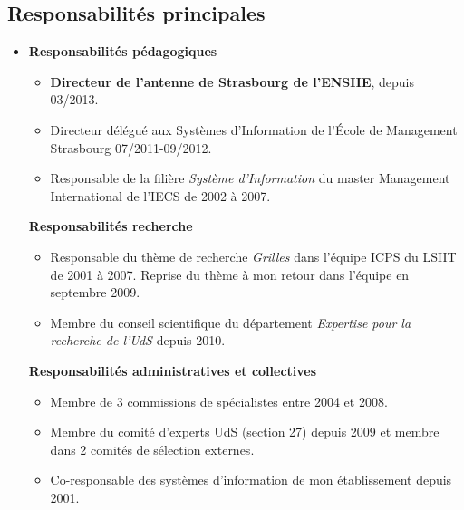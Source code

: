 \documentclass[11pt]{article}
\begin{document}

\subsection{Responsabilités principales}
\vspace{3mm}
\medskip

\begin{itemize}
\item
 	\textbf{Responsabilités pédagogiques}\\[-1mm]
	\begin{itemize}
		\item \textbf{Directeur de l'antenne de Strasbourg de l'ENSIIE}, depuis 03/2013.
		\item Directeur délégué aux Systèmes d'Information de 
		      l'\'Ecole de Management Strasbourg 07/2011-09/2012.
		\item Responsable de la filière \textit{Système d'Information} 
		      du master Management International de l'IECS de 2002 à 2007.\\
	\end{itemize}

 	\textbf{Responsabilités recherche}
	\begin{itemize}
		\item Responsable du thème de recherche \textit{Grilles} dans 
		      l'équipe ICPS du LSIIT de 2001 à 2007. 
			Reprise du thème à mon retour dans l'équipe en septembre 2009.
		\item Membre du conseil scientifique du département \emph{Expertise 
		      pour la recherche de l'UdS} depuis 2010.\\
	\end{itemize}

 	\textbf{Responsabilités administratives et collectives}
	\begin{itemize}
		\item Membre de 3 commissions de spécialistes entre 2004 et 2008.
		\item Membre du comité d'experts UdS (section 27) depuis 2009 et 
		      membre dans 2 comités de sélection externes.
	      \item Co-responsable des systèmes d'information de mon 
		      établissement depuis 2001.\\
	\end{itemize}
\end{itemize}


\newpage
\setlength{\parindent}{5mm}
\setlength{\itemsep}{2mm}
\end{document}
